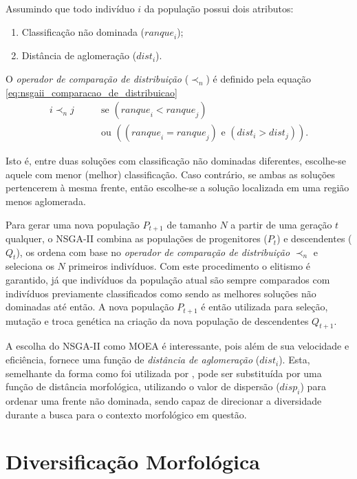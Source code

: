 Assumindo que todo indivíduo $i$ da população possui dois atributos:
\vspace{-5mm}
\begin{enumerate}[leftmargin=1\parindent, noitemsep]
\item Classificação não dominada (${ranque}_i$);
\item Distância de aglomeração (${dist}_i$).
\end{enumerate}
O \emph{operador de comparação de distribuição} ($\prec_n$) é definido pela equação \ref{eq:nsgaii_comparacao_de_distribuicao}
\begin{equation}
    \begin{aligned}
        i\prec_nj & \quad \quad \text{se }({ranque}_i<{ranque}_j) \\
        & \quad \quad \text{ou } (({ranque}_i={ranque}_j) \text{ e }({dist}_i>{dist}_j)).
    \end{aligned}
    \label{eq:nsgaii_comparacao_de_distribuicao}
\end{equation}

Isto é, entre duas soluções com classificação não dominadas diferentes, escolhe-se aquele com menor (melhor) classificação. Caso contrário, se ambas as soluções pertencerem à mesma frente, então escolhe-se a solução localizada em uma região menos aglomerada.

Para gerar uma nova população $P_{t+1}$ de tamanho $N$ a partir de uma geração $t$ qualquer, o NSGA-II combina as populações de progenitores ($P_t$) e descendentes ($Q_t$), os ordena com base no \emph{operador de comparação de distribuição} $\prec_n$ e seleciona os $N$ primeiros indivíduos. Com este procedimento o elitismo é garantido, já que indivíduos da população atual são sempre comparados com indivíduos previamente classificados como sendo as melhores soluções não dominadas até então. A nova população $P_{t+1}$ é então utilizada para seleção, mutação e troca genética na criação da nova população de descendentes $Q_{t+1}$.

A escolha do NSGA-II como MOEA é interessante, pois além de sua velocidade e eficiência, fornece uma função de \emph{distância de aglomeração} (${dist}_i$). Esta, semelhante da forma como foi utilizada por \cite{lehman2011evolving}, pode ser substituída por uma função de distância morfológica, utilizando o valor de dispersão (${disp}_i$) para ordenar uma frente não dominada, sendo capaz de direcionar a diversidade durante a busca para o contexto morfológico em questão.

\section{Diversificação Morfológica}

